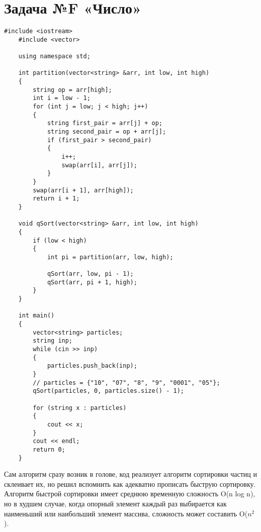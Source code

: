 \documentclass{article}
\begin{document}
\section{Задача №F «Число»}
\begin{lstlisting}[frame=single, basicstyle=\ttfamily, breaklines=true, breakatwhitespace=true, postbreak=\mbox{\textcolor{red}{$\hookrightarrow$}\space}]
    #include <iostream>
    #include <vector>
    
    using namespace std;
    
    int partition(vector<string> &arr, int low, int high)
    {
        string op = arr[high];
        int i = low - 1;
        for (int j = low; j < high; j++)
        {
            string first_pair = arr[j] + op;
            string second_pair = op + arr[j];
            if (first_pair > second_pair)
            {
                i++;
                swap(arr[i], arr[j]);
            }
        }
        swap(arr[i + 1], arr[high]);
        return i + 1;
    }
    
    void qSort(vector<string> &arr, int low, int high)
    {
        if (low < high)
        {
            int pi = partition(arr, low, high);
    
            qSort(arr, low, pi - 1);  
            qSort(arr, pi + 1, high); 
        }
    }
    
    int main()
    {
        vector<string> particles;
        string inp;
        while (cin >> inp)
        {
            particles.push_back(inp);
        }
        // particles = {"10", "07", "8", "9", "0001", "05"};
        qSort(particles, 0, particles.size() - 1);
    
        for (string x : particles)
        {
            cout << x;
        }
        cout << endl;
        return 0;
    }    
\end{lstlisting}
Сам алгоритм сразу возник в голове, код реализует алгоритм сортировки частиц и склеивает их, но решил вспомнить как адекватно прописать быструю сортировку. 
Алгоритм быстрой сортировки имеет среднюю временную сложность O(n log n), но в худшем случае, когда опорный элемент каждый раз выбирается как наименьший или наибольший элемент массива, сложность может составить O($n^2$).
\end{document}
